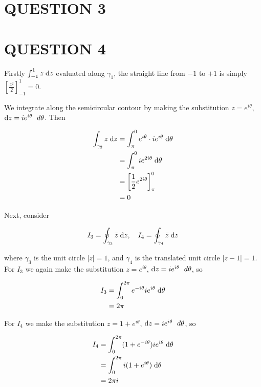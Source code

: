 \documentclass[a4paper]{article}
\begin{document}
\section{QUESTION 3}



\section{QUESTION 4}

Firstly $ \int_{-1}^{1} z \; \mathrm{d} z $ evaluated along $ \gamma_{1} $, the straight line from $ -1 $ to $ +1 $ is simply $ \left[  \frac{z^{2}}{2} \right]_{-1}^{1} = 0 $. 

We integrate along the semicircular contour by making the substitution $ z = e^{i \theta} $, $ \mathrm{d} z = i e^{i \theta} \; \ d \theta $. Then

\begin{align*}
\int_{\gamma_{2}} z \; \mathrm{d} z & = \int_{\pi}^{0} e^{i \theta} \cdot i e^{i \theta} \; \mathrm{d} \theta  \\
& = \int_{\pi}^{0} i e^{2i \theta} \; \mathrm{d} \theta \\
& = \left[ \frac{1}{2} e^{2 i \theta}  \right]_{\pi}^{0} \\
& = 0
\end{align*}

Next, consider 

\[ I_{3} = \oint_{\gamma_{3}} \bar{z} \; \mathrm{d} z, \quad I_{4} = \oint_{\gamma_{4}} \bar{z} \; \mathrm{d} z\]

where $ \gamma_{3} $ is the unit circle $ | z | = 1 $, and $ \gamma_{4} $ is the translated unit circle $ | z - 1 | = 1 $. For $ I_{3} $ we again make the substitution $ z = e^{i \theta} $, $ \mathrm{d} z = i e^{i \theta} \; \ d \theta $, so 

\begin{align*}
I_{3} & = \int_{0}^{2\pi} e^{-i \theta} i e^{i \theta} \; \mathrm{d} \theta \\
& = 2 \pi
\end{align*}

For $ I_{4} $ we make the substitution $ z = 1 + e^{i \theta} $, $ \mathrm{d} z = i e^{i \theta} \; \ d \theta $, so 

\begin{align*}
I_{4} & = \int_{0}^{2\pi} (1 + e^{-i \theta}) i e^{i \theta} \; \mathrm{d} \theta \\
& = \int_{0}^{2\pi} i( 1 + e^{i \theta}) \; \mathrm{d} \theta \\
& = 2 \pi i
\end{align*}
\end{document}
